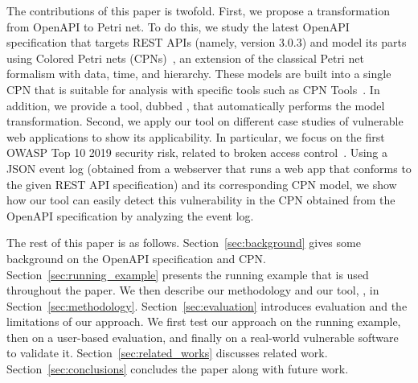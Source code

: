 The contributions of this paper is twofold. First, we propose a transformation from OpenAPI to Petri net. To do this, we study the latest OpenAPI specification that targets REST APIs (namely, version $3.0.3$) and model its parts using Colored Petri nets (CPNs)~\cite{jensen2009coloured}, an extension of the classical Petri net formalism with data, time, and hierarchy. These models are built into a single CPN that is suitable for analysis with specific tools such as CPN Tools~\cite{ratzer2003cpn}. In addition, we provide a tool, dubbed {\nameTool}, that automatically performs the model transformation. Second, we apply our tool on different case studies of vulnerable web applications to show its applicability. In particular, we focus on the first OWASP Top 10 2019 security risk, related to broken access control~\cite{AJBC-ICNGIoT-22}. Using a JSON event log (obtained from a webserver that runs a web app that conforms to the given REST API specification) and its corresponding CPN model, we show how our tool can easily detect this vulnerability in the CPN obtained from the OpenAPI specification by analyzing the event log. 

The rest of this paper is as follows. Section~\ref{sec:background} gives some background on the OpenAPI specification and CPN. Section~\ref{sec:running_example}  presents the running example that is used throughout the paper. We then describe our methodology and our tool,  {\nameTool}, in Section~\ref{sec:methodology}. Section~\ref{sec:evaluation} introduces evaluation and the limitations of our approach. We first test our approach on the running example, then on a user-based evaluation, and finally on a real-world vulnerable software to validate it. Section~\ref{sec:related_works} discusses related work. Section~\ref{sec:conclusions} concludes the paper along with future work.